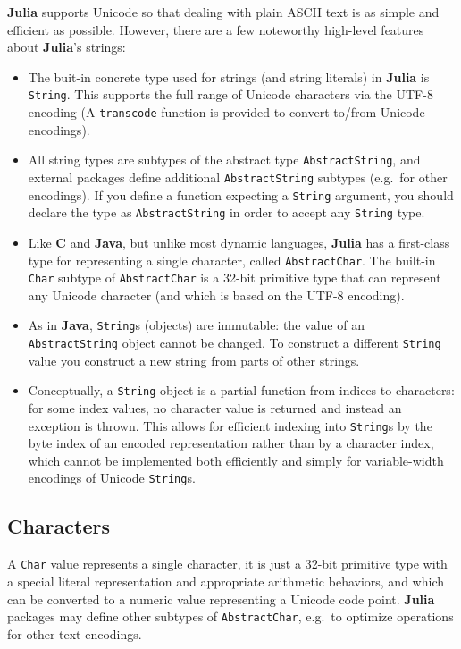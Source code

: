 \documentclass[
]{article}
\providecommand{\tightlist}{%
  \setlength{\itemsep}{0pt}\setlength{\parskip}{0pt}}
\begin{document}
\textbf{Julia} supports Unicode so that dealing with plain ASCII text is
as simple and efficient as possible. However, there are a few noteworthy
high-level features about \textbf{Julia}'s strings:

\begin{itemize}
\tightlist
\item
  The buit-in concrete type used for strings (and string literals) in
  \textbf{Julia} is \texttt{String}. This supports the full range of
  Unicode characters via the UTF-8 encoding (A \texttt{transcode}
  function is provided to convert to/from Unicode encodings).
\item
  All string types are subtypes of the abstract type
  \texttt{AbstractString}, and external packages define additional
  \texttt{AbstractString} subtypes (e.g.~for other encodings). If you
  define a function expecting a \texttt{String} argument, you should
  declare the type as \texttt{AbstractString} in order to accept any
  \texttt{String} type.
\item
  Like \textbf{C} and \textbf{Java}, but unlike most dynamic languages,
  \textbf{Julia} has a first-class type for representing a single
  character, called \texttt{AbstractChar}. The built-in \texttt{Char}
  subtype of \texttt{AbstractChar} is a 32-bit primitive type that can
  represent any Unicode character (and which is based on the UTF-8
  encoding).
\item
  As in \textbf{Java}, \texttt{String}s (objects) are immutable: the
  value of an \texttt{AbstractString} object cannot be changed. To
  construct a different \texttt{String} value you construct a new string
  from parts of other strings.
\item
  Conceptually, a \texttt{String} object is a partial function from
  indices to characters: for some index values, no character value is
  returned and instead an exception is thrown. This allows for efficient
  indexing into \texttt{String}s by the byte index of an encoded
  representation rather than by a character index, which cannot be
  implemented both efficiently and simply for variable-width encodings
  of Unicode \texttt{String}s.
\end{itemize}

\hypertarget{characters}{%
\subsection{Characters}\label{characters}}

A \texttt{Char} value represents a single character, it is just a 32-bit
primitive type with a special literal representation and appropriate
arithmetic behaviors, and which can be converted to a numeric value
representing a Unicode code point. \textbf{Julia} packages may define
other subtypes of \texttt{AbstractChar}, e.g.~to optimize operations for
other text encodings.
\end{document}
